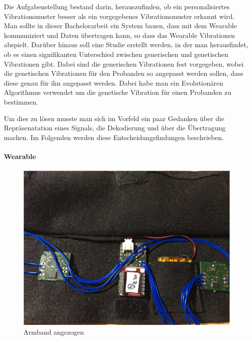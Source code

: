 
Die Aufgabenstellung bestand darin, herauszufinden, ob ein personalisiertes Vibrationsmuster besser als ein vorgegebenes Vibrationsmuster erkannt wird.
Man sollte in dieser Bachelorarbeit ein System bauen, dass mit dem Wearable kommuniziert und Daten {\"u}bertragen kann, so dass das Wearable Vibrationen abspielt. Dar{\"u}ber hinaus soll eine Studie erstellt werden, in der man herausfindet, ob es einen signifikanten Unterschied zwischen generischen und genetischen Vibrationen gibt. Dabei sind die generischen Vibrationen fest vorgegeben, wobei die genetischen Vibrationen f{\"u}r den Probanden so angepasst werden sollen, dass diese genau f{\"u}r ihn angepasst werden. Dabei habe man ein Evolution{\"a}ren Algorithmus verwendet um die genetische Vibration f{\"u}r einen Probanden zu bestimmen. 

Um dies zu l{\"o}sen musste man sich im Vorfeld ein paar Gedanken {\"u}ber die Repr{\"a}senatation eines Signals, die Dekodierung und {\"u}ber die {\"U}bertragung machen.
Im Folgenden werden diese Entscheidungsfindungen beschrieben.

\paragraph{Wearable}

\begin{figure}
	\centering
    \includegraphics[width=\textwidth]{pics/wristband1.png}
    \caption{Armband angezogen}
    \label{fig:wristband1}
\end{figure}

